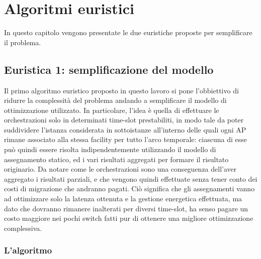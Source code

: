 \chapter{Algoritmi euristici}
\label{cap:algoritmi-euristici}

In questo capitolo vengono presentate le due euristiche proposte per semplificare il problema.

%
%
\section{Euristica 1: semplificazione del modello}
\label{sec:semplificazione-modello}

Il primo algoritmo euristico proposto in questo lavoro si pone l'obbiettivo di ridurre la complessità del problema andando a semplificare il modello di ottimizzazione utilizzato. In particolare, l'idea è quella di effettuare le orchestrazioni solo in determinati time-slot prestabiliti, in modo tale da poter suddividere l'istanza considerata in sottoistanze all'interno delle quali ogni AP rimane associato alla stessa facility per tutto l'arco temporale: ciascuna di esse può quindi essere risolta indipendentemente utilizzando il modello di assegnamento statico, ed i vari risultati aggregati per formare il risultato originario. Da notare come le orchestrazioni sono una conseguenza dell'aver aggregato i risultati parziali, e che vengono quindi effettuate senza tener conto dei costi di migrazione che andranno pagati. Ciò significa che gli assegnamenti vanno ad ottimizzare solo la latenza ottenuta e la gestione energetica effettuata, ma dato che dovranno rimanere inalterati per diversi time-slot, ha senso pagare un costo maggiore nei pochi switch fatti pur di ottenere una migliore ottimizzazione complessiva.

\subsection{L'algoritmo}
\label{subsec:algo-model}



